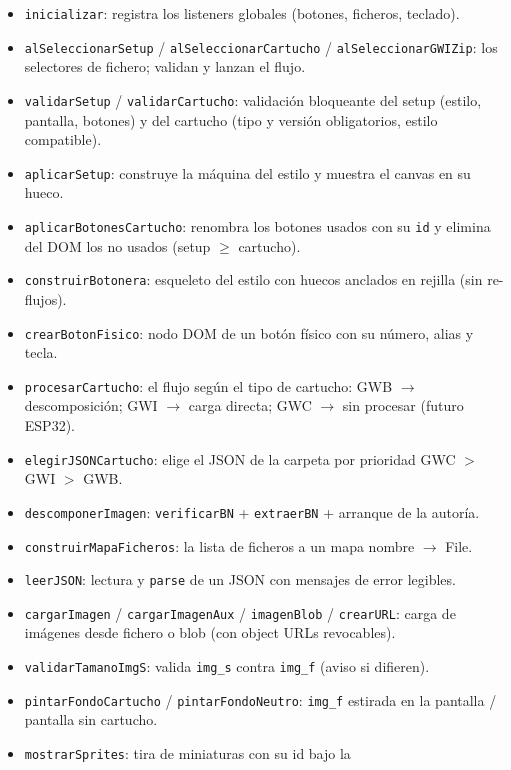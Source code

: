 \documentclass[../main.tex]{subfiles}
\begin{document}
	\begin{itemize}
		\item \texttt{inicializar}: registra los listeners globales
		(botones, ficheros, teclado).
		\item \texttt{alSeleccionarSetup} / \texttt{alSeleccionarCartucho}
		/ \texttt{alSeleccionarGWIZip}: los selectores de fichero; validan
		y lanzan el flujo.
		\item \texttt{validarSetup} / \texttt{validarCartucho}: validación
		bloqueante del setup (estilo, pantalla, botones) y del cartucho
		(tipo y versión obligatorios, estilo compatible).
		\item \texttt{aplicarSetup}: construye la máquina del estilo y
		muestra el canvas en su hueco.
		\item \texttt{aplicarBotonesCartucho}: renombra los botones usados
		con su \texttt{id} y elimina del DOM los no usados
		(setup $\geq$ cartucho).
		\item \texttt{construirBotonera}: esqueleto del estilo con huecos
		anclados en rejilla (sin re-flujos).
		\item \texttt{crearBotonFisico}: nodo DOM de un botón físico con su
		número, alias y tecla.
		\item \texttt{procesarCartucho}: el flujo según el tipo de
		cartucho: GWB $\rightarrow$ descomposición; GWI $\rightarrow$ carga
		directa; GWC $\rightarrow$ sin procesar (futuro ESP32).
		\item \texttt{elegirJSONCartucho}: elige el JSON de la carpeta por
		prioridad GWC $>$ GWI $>$ GWB.
		\item \texttt{descomponerImagen}: \texttt{verificarBN} +
		\texttt{extraerBN} + arranque de la autoría.
		\item \texttt{construirMapaFicheros}: la lista de ficheros a un mapa
		nombre $\rightarrow$ File.
		\item \texttt{leerJSON}: lectura y \texttt{parse} de un JSON con
		mensajes de error legibles.
		\item \texttt{cargarImagen} / \texttt{cargarImagenAux} /
		\texttt{imagenBlob} / \texttt{crearURL}: carga de imágenes desde
		fichero o blob (con object URLs revocables).
		\item \texttt{validarTamanoImgS}: valida \texttt{img\_s} contra
		\texttt{img\_f} (aviso si difieren).
		\item \texttt{pintarFondoCartucho} / \texttt{pintarFondoNeutro}:
		\texttt{img\_f} estirada en la pantalla / pantalla sin cartucho.
		\item \texttt{mostrarSprites}: tira de miniaturas con su id bajo la

\end{itemize}
\end{document}
